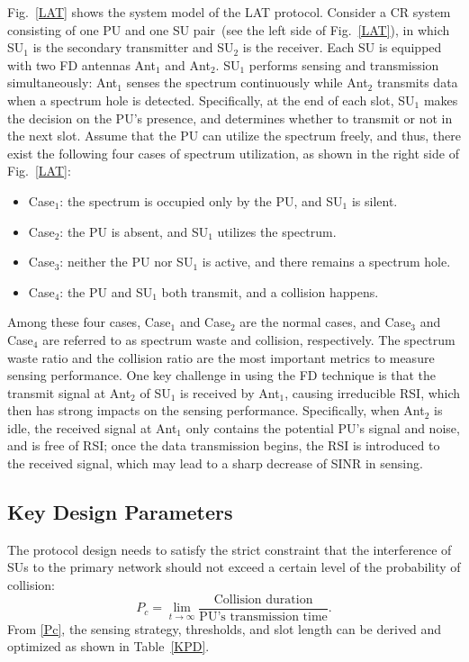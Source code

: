 \documentclass[onecolumn,12pt]{IEEEtran}
\begin{document}
Fig.~\ref{LAT} shows the system model of the LAT protocol. Consider a CR system consisting of one PU and one SU pair~(see the left side of Fig.~\ref{LAT}), in which SU$_1$ is the secondary transmitter and SU$_2$ is the receiver. Each SU is equipped with two FD antennas Ant$_1$ and Ant$_2$. SU$_1$ performs sensing and transmission simultaneously: Ant$_1$ senses the spectrum continuously while Ant$_2$ transmits data when a spectrum hole is detected. Specifically, at the end of each slot, SU$_1$ makes the decision on the PU's presence, and determines whether to transmit or not in the next slot. Assume that the PU can utilize the spectrum freely, and thus, there exist the following four cases of spectrum utilization, as shown in the right side of Fig.~\ref{LAT}:
\begin{itemize}
    \item Case$_1$: the spectrum is occupied only by the PU, and SU$_1$ is silent.
    \item Case$_2$: the PU is absent, and SU$_1$ utilizes the spectrum.
    \item Case$_3$: neither the PU nor SU$_1$ is active, and there remains a spectrum hole.
    \item Case$_4$: the PU and SU$_1$ both transmit, and a collision happens.
\end{itemize}



Among these four cases, Case$_1$ and Case$_2$ are the normal cases, and Case$_3$ and Case$_4$ are referred to as spectrum waste and collision, respectively. The spectrum waste ratio and the collision ratio are the most important metrics to measure sensing performance. One key challenge in using the FD technique is that the transmit signal at Ant$_2$ of SU$_1$ is received by Ant$_1$, causing irreducible RSI, which then has strong impacts on the sensing performance. Specifically, when Ant$_2$ is idle, the received signal at Ant$_1$ only contains the potential PU's signal and noise, and is free of RSI; once the data transmission begins, the RSI is introduced to the received signal, which may lead to a sharp decrease of SINR in sensing.

\subsection{Key Design Parameters}

The protocol design needs to satisfy the strict constraint that the interference of SUs to the primary network should not exceed a certain level of the probability of collision:
\begin{equation}\label{Pc}
P_c = \lim_{t\rightarrow\infty}\frac{\text{Collision duration}}{\text{PU's transmission time}}.
\end{equation}
From \eqref{Pc}, the sensing strategy, thresholds, and slot length can be derived and optimized as shown in Table~\ref{KPD}.
\end{document}
